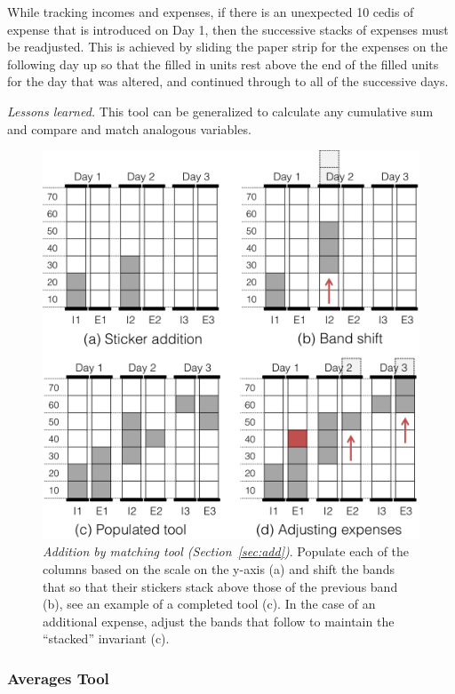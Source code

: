 \documentclass{sig-alternate}
\begin{document}
While tracking incomes and expenses, if there is an unexpected 10 cedis of expense that is introduced on Day 1, then the successive stacks of expenses must be readjusted. This is achieved by sliding the paper strip for the expenses on the following day up so that the filled in units rest above the end of the filled units for the day that was altered, and continued through to all of the successive days.

\emph{Lessons learned.} This tool can be generalized to calculate any cumulative sum and compare and match analogous variables.

\begin{figure}
\centering
\includegraphics[width=.9\linewidth]{img/add.png}
\caption{\emph{Addition by matching tool (Section~\ref{sec:add})}. Populate each of the columns based on the scale on the y-axis (a) and shift the bands that so that their stickers stack above those of the previous band (b), see an example of a completed tool (c). In the case of an additional expense, adjust the bands that follow to maintain the ``stacked'' invariant (c).}
\label{fig:add}
\end{figure}

\subsubsection{Averages Tool}
\label{sec:average}
\end{document}
